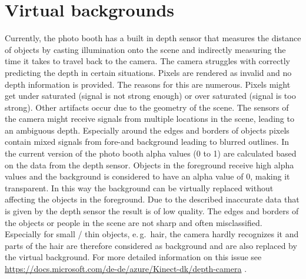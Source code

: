 \documentclass[11pt,
  paper=a4, 
  bibliography=totocnumbered,
	captions=tableheading,
	BCOR=10mm
]{scrreprt}
\theoremstyle{definition}
\newcommand{\eg}{e.\,g.~}
\begin{document}
\section{Virtual backgrounds}
Currently, the photo booth has a built in depth sensor that measures the distance of objects by casting illumination onto the scene and indirectly measuring the time it takes to travel back to the camera. 
The camera struggles with correctly predicting the depth in certain situations. 
Pixels are rendered as invalid and no depth information is provided. 
The reasons for this are numerous. 
Pixels might get under saturated (signal is not strong enough) or over saturated (signal is too strong). 
Other artifacts occur due to the geometry of the scene. 
The sensors of the camera might receive signals from multiple locations in the scene, leading to an ambiguous depth. 
Especially around the edges and borders of objects pixels contain mixed signals from fore-and background leading to blurred outlines.
In the current version of the photo booth alpha values (0 to 1) are calculated based on the data from the depth sensor. 
Objects in the foreground receive high alpha values and the background is considered to have an alpha value of 0, making it transparent. 
In this way the background can be virtually replaced without affecting the objects in the foreground. 
Due to the described inaccurate data that is given by the depth sensor the result is of low quality. 
The edges and borders of the objects or people in the scene are not sharp and often misclassified. 
Especially for small / thin objects, \eg hair, the camera hardly recognizes it and parts of the hair are therefore considered as background and are also replaced by the virtual background.
For more detailed information on this issue see \url{https://docs.microsoft.com/de-de/azure/Kinect-dk/depth-camera} \cite{Microsoft2019}.
\end{document}
